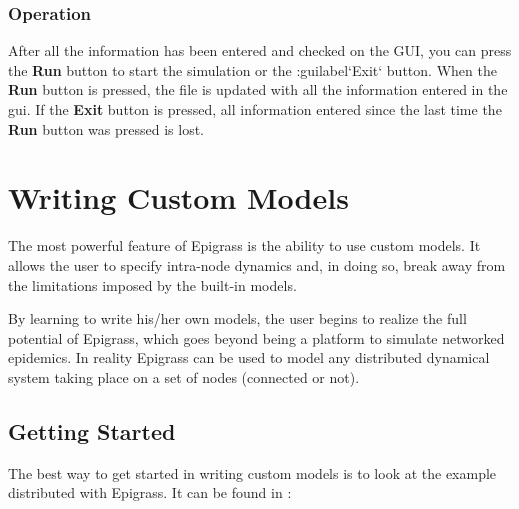 \documentclass[a4paper,10pt]{manual}
\begin{document}
\subsection{Operation}

After all the information has been entered and checked on the GUI, you can press the \textbf{Run} button to start the simulation or the :guilabel`Exit` button. When the \textbf{Run} button is pressed, the  file is updated with all the information entered in the gui. If the \textbf{Exit} button is pressed, all information entered since the last time the \textbf{Run} button was pressed is lost.

\resetcurrentobjects

\resetcurrentobjects


\hypertarget{custom}{}\chapter{Writing Custom Models}
The most powerful feature of Epigrass is the ability to use custom
models. It allows the user to specify intra-node dynamics and, in
doing so, break away from the limitations imposed by the built-in
models.

By learning to write his/her own models, the user begins to realize
the full potential of Epigrass, which goes beyond being a platform to
simulate networked epidemics. In reality Epigrass can be used to model
any distributed dynamical system taking place on a set of nodes
(connected or not).


\section{Getting Started}

The best way to get started in writing custom models is to look at the
example distributed with Epigrass. It can be found in
:
\end{document}
